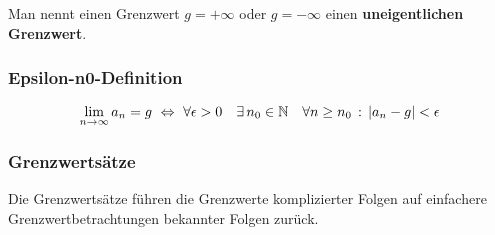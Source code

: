 \begin{Bemerkung}
Man nennt einen Grenzwert $g=+\infty$ oder $g=-\infty$ einen \textbf{uneigentlichen Grenzwert}.
\end{Bemerkung}


\subsubsection{Epsilon-n0-Definition}
\begin{Definition}
$$\lim\limits_{n\to\infty}a_n=g \ \Leftrightarrow\ \forall  \epsilon > 0\quad \exists\, n_0 \in\N \quad \forall n\geq n_0\,:\, |a_n-g|<\epsilon$$
\end{Definition}
\subsubsection{Grenzwertsätze}


Die Grenzwertsätze führen die Grenzwerte komplizierter Folgen auf einfachere Grenzwertbetrachtungen bekannter Folgen zurück.\\
\begin{Theorem}
\end{Theorem}
